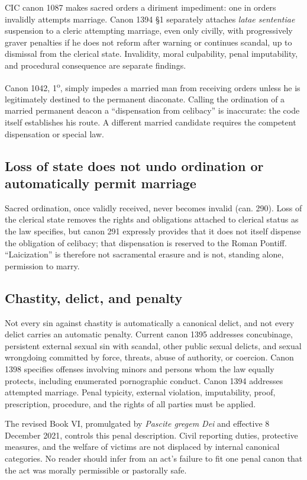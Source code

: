 CIC canon 1087 makes sacred orders a diriment impediment: one in orders invalidly attempts marriage. Canon 1394 \S1 separately attaches \emph{latae sententiae} suspension to a cleric attempting marriage, even only civilly, with progressively graver penalties if he does not reform after warning or continues scandal, up to dismissal from the clerical state. Invalidity, moral culpability, penal imputability, and procedural consequence are separate findings.

Canon 1042, 1\textsuperscript{o}, simply impedes a married man from receiving orders unless he is legitimately destined to the permanent diaconate. Calling the ordination of a married permanent deacon a ``dispensation from celibacy'' is inaccurate: the code itself establishes his route. A different married candidate requires the competent dispensation or special law.

\subsection{Loss of state does not undo ordination or automatically permit marriage}

Sacred ordination, once validly received, never becomes invalid (can. 290). Loss of the clerical state removes the rights and obligations attached to clerical status as the law specifies, but canon 291 expressly provides that it does not itself dispense the obligation of celibacy; that dispensation is reserved to the Roman Pontiff. ``Laicization'' is therefore not sacramental erasure and is not, standing alone, permission to marry.

\subsection{Chastity, delict, and penalty}

Not every sin against chastity is automatically a canonical delict, and not every delict carries an automatic penalty. Current canon 1395 addresses concubinage, persistent external sexual sin with scandal, other public sexual delicts, and sexual wrongdoing committed by force, threats, abuse of authority, or coercion. Canon 1398 specifies offenses involving minors and persons whom the law equally protects, including enumerated pornographic conduct. Canon 1394 addresses attempted marriage. Penal typicity, external violation, imputability, proof, prescription, procedure, and the rights of all parties must be applied.

The revised Book VI, promulgated by \emph{Pascite gregem Dei} and effective 8 December 2021, controls this penal description. Civil reporting duties, protective measures, and the welfare of victims are not displaced by internal canonical categories. No reader should infer from an act's failure to fit one penal canon that the act was morally permissible or pastorally safe.

